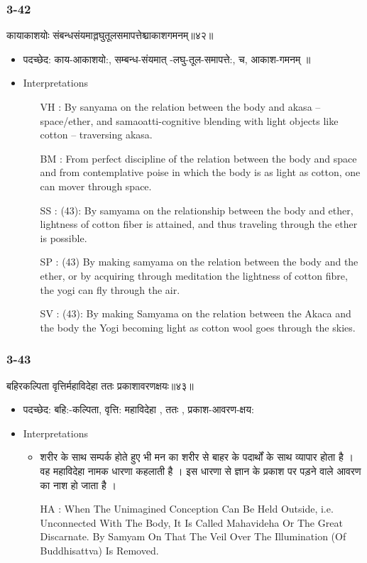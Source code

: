 \begin{frame}[fragile]\frametitle{3-42}
\begin{sanskrit}
कायाकाशयोः संबन्धसंयमाल्लघुतूलसमापत्तेश्चाकाशगमनम्॥४२॥
\end{sanskrit}

	\begin{itemize}
	\item पदच्छेद:  काय-आकाशयो:, सम्बन्ध-‌संयमात् -लघु-तूल-समापत्ते:, च, आकाश-गमनम् ॥
	\item Interpretations
		\begin{itemize}	
		\item [VH]: By sanyama on the relation between the body and akasa – space/ether, and samaoatti-cognitive blending with light objects like cotton – traversing akasa.
		\item [BM]: From perfect discipline of the relation between the body and space and from contemplative poise in which the body is as light as cotton, one can mover through space.
		\item [SS]: (43): By samyama on the relationship between the body and ether, lightness of cotton fiber is attained, and thus traveling through the ether is possible.
		\item [SP]: (43) By making samyama on the relation between the body and the ether, or by acquiring through meditation the lightness of cotton fibre, the yogi can fly through the air.
		\item [SV]: (43): By making Samyama on the relation between the Akaca and the body the Yogi becoming light as cotton wool goes through the skies.
		\end{itemize}
	\end{itemize}
\end{frame}


\begin{frame}[fragile]\frametitle{3-43}
\begin{sanskrit}
बहिरकल्पिता वृत्तिर्महाविदेहा ततः प्रकाशावरणक्षयः॥४३॥
\end{sanskrit}

	\begin{itemize}
	\item पदच्छेद: बहि:-कल्पिता, वृत्ति: महाविदेहा , ततः , प्रकाश-आवरण-क्षय:
	\item Interpretations
		\begin{itemize}	
		\item शरीर के साथ सम्पर्क होते हुए भी मन का शरीर से बाहर के पदार्थों के साथ व्यापार होता है । वह महाविदेहा नामक धारणा कहलाती है । इस धारणा से ज्ञान के प्रकाश पर पड़ने वाले आवरण का नाश हो जाता है ।
		\item [HA]: When The Unimagined Conception Can Be Held Outside, i.e. Unconnected With The Body, It Is Called Mahavideha Or The Great Discarnate. By Samyam On That The Veil Over The Illumination (Of Buddhisattva) Is Removed.
		\end{itemize}
	\end{itemize}
\end{frame}

